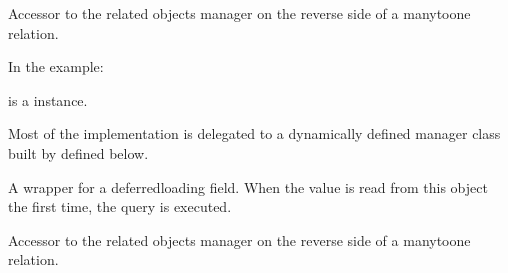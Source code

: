 \documentclass[letterpaper,10pt,english]{sphinxmanual}
\begin{document}
\begin{fulllineitems}
\begin{fulllineitems}
\end{fulllineitems}


\begin{fulllineitems}
\label{\detokenize{organisations:organisations.models.Organisation.secondary_org}}
Accessor to the related objects manager on the reverse side of a
many\sphinxhyphen{}to\sphinxhyphen{}one relation.

In the example:

\begin{sphinxVerbatim}[commandchars=\\\{\}]
 
       
\end{sphinxVerbatim}

 is a  instance.

Most of the implementation is delegated to a dynamically defined manager
class built by  defined below.

\end{fulllineitems}


\begin{fulllineitems}
\label{\detokenize{organisations:organisations.models.Organisation.state}}
A wrapper for a deferred\sphinxhyphen{}loading field. When the value is read from this
object the first time, the query is executed.

\end{fulllineitems}


\begin{fulllineitems}
\label{\detokenize{organisations:organisations.models.Organisation.stripetransaction_set}}
Accessor to the related objects manager on the reverse side of a
many\sphinxhyphen{}to\sphinxhyphen{}one relation.


\end{fulllineitems}
\end{fulllineitems}
\end{document}
